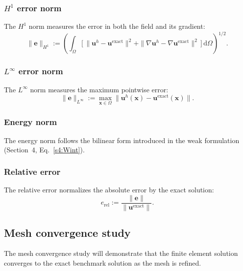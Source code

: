 \documentclass[11pt]{article}
\newcommand{\bx}{\mathbf{x}}
\newcommand{\bx}{\mathbf{x}}
\begin{document}
\subsubsection{$H^{1}$ error norm}

The $H^{1}$ norm measures the error in both the field and its gradient:
\begin{equation}
\|\mathbf{e}\|_{H^{1}}
:= \left(\int_{\Omega}
   \bigl[\,\|\mathbf{u}^{h}-\mathbf{u}^{\mathrm{exact}}\|^{2}
   + \|\nabla\mathbf{u}^{h}-\nabla\mathbf{u}^{\mathrm{exact}}\|^{2}\,\bigr]\,
   \mathrm{d}\Omega\right)^{1/2}.
\label{s8:H1_norm}
\end{equation}

\subsubsection{$L^{\infty}$ error norm}

The $L^{\infty}$ norm measures the maximum pointwise error:
\begin{equation}
\|\mathbf{e}\|_{L^{\infty}}
:= \max_{\bx\in\Omega}
   \|\mathbf{u}^{h}(\bx)-\mathbf{u}^{\mathrm{exact}}(\bx)\|.
\label{s8:Linfinity_norm}
\end{equation}

\subsubsection{Energy norm}

The energy norm follows the bilinear form introduced in the weak formulation (Section~4, Eq.~\eqref{s4:Wint}).

\subsubsection{Relative error}

The relative error normalizes the absolute error by the exact solution:
\begin{equation}
e_{\mathrm{rel}}
:= \frac{\|\mathbf{e}\|}{\|\mathbf{u}^{\mathrm{exact}}\|}.
\label{s8:relative_error}
\end{equation}

\subsection{Mesh convergence study}
\label{ssec:convergence_study}

The mesh convergence study will demonstrate that the finite element solution
converges to the exact benchmark solution as the mesh is refined.
\end{document}
